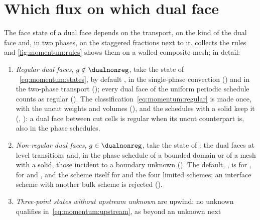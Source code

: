 \section{Which flux on which dual face}\label{sec:momentum:flux-rules}
The face state of a dual face depends on the transport, on the kind of the
dual face and, in two phases, on the staggered fractions next to it.
 collects the rules and \cref{fig:momentum:rules}
shows them on a walled composite mesh; in detail:
\begin{sloppypar}
\begin{enumerate}
\item \emph{Regular dual faces}, $g\notin\dualnonreg$, take the state of
  ~\cref{eq:momentum:states}, by default , in
  the single-phase convection
  ()
  and in the two-phase transport
  ();
  every dual face of the uniform periodic schedule counts as regular
  ().
  The classification~\cref{eq:momentum:regular} is made once, with the uncut
  weights and volumes
  (),
  and the schedules with a solid keep it
  (,
  ): a dual face
  between cut cells is regular when its uncut counterpart is, also in the
  phase schedules.
\item \emph{Non-regular dual faces}, $g\in\dualnonreg$, take the state of
  : the dual faces at level transitions and, in
  the phase schedule of a bounded domain or of a mesh with a solid, those
  incident to a boundary unknown
  ().
  The default,
  , is  for
  ,  for  and
  , and the scheme itself for  and the
  four limited schemes; an  interface scheme with another
  bulk scheme is rejected
  ().
\item \emph{Three-point states without upstream unknown} are upwind: no
  unknown qualifies in~\cref{eq:momentum:upstream}, as beyond an unknown next

\end{enumerate}
\end{sloppypar}
